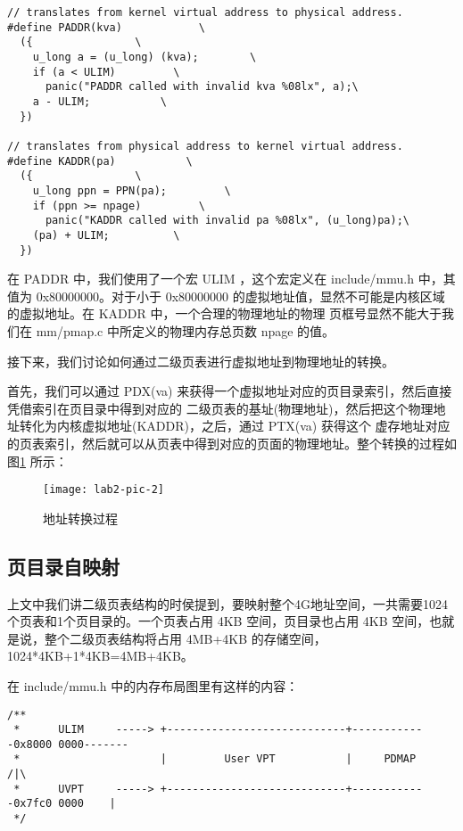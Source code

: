 \begin{verbatim}
// translates from kernel virtual address to physical address.
#define PADDR(kva)            \
  ({                \
    u_long a = (u_long) (kva);        \
    if (a < ULIM)         \
      panic("PADDR called with invalid kva %08lx", a);\
    a - ULIM;           \
  })

// translates from physical address to kernel virtual address.
#define KADDR(pa)           \
  ({                \
    u_long ppn = PPN(pa);         \
    if (ppn >= npage)         \
      panic("KADDR called with invalid pa %08lx", (u_long)pa);\
    (pa) + ULIM;          \
  })
\end{verbatim}

在 PADDR 中，我们使用了一个宏 ULIM ，这个宏定义在 include/mmu.h 中，其值为 0x80000000。对于小于
 0x80000000 的虚拟地址值，显然不可能是内核区域的虚拟地址。在 KADDR 中，一个合理的物理地址的物理
页框号显然不能大于我们在 mm/pmap.c 中所定义的物理内存总页数 npage 的值。

接下来，我们讨论如何通过二级页表进行虚拟地址到物理地址的转换。

首先，我们可以通过 PDX(va) 来获得一个虚拟地址对应的页目录索引，然后直接凭借索引在页目录中得到对应的
二级页表的基址(物理地址)，然后把这个物理地址转化为内核虚拟地址(KADDR)，之后，通过 PTX(va) 获得这个
虚存地址对应的页表索引，然后就可以从页表中得到对应的页面的物理地址。整个转换的过程如 图\ref{lab2-pic-2}
所示：

\begin{figure}[htbp]
  \centering
  \texttt{[image: lab2-pic-2]}
  \caption{地址转换过程}\label{lab2-pic-2}
\end{figure}

\subsection{页目录自映射}

上文中我们讲二级页表结构的时侯提到，要映射整个4G地址空间，一共需要1024个页表和1个页目录的。一个页表占用 4KB
空间，页目录也占用 4KB 空间，也就是说，整个二级页表结构将占用 4MB+4KB 的存储空间，1024*4KB+1*4KB=4MB+4KB。

在 include/mmu.h 中的内存布局图里有这样的内容：

\begin{verbatim}
/**
 *      ULIM     -----> +----------------------------+------------0x8000 0000-------
 *                      |         User VPT           |     PDMAP                /|\
 *      UVPT     -----> +----------------------------+------------0x7fc0 0000    |
 */
\end{verbatim}

